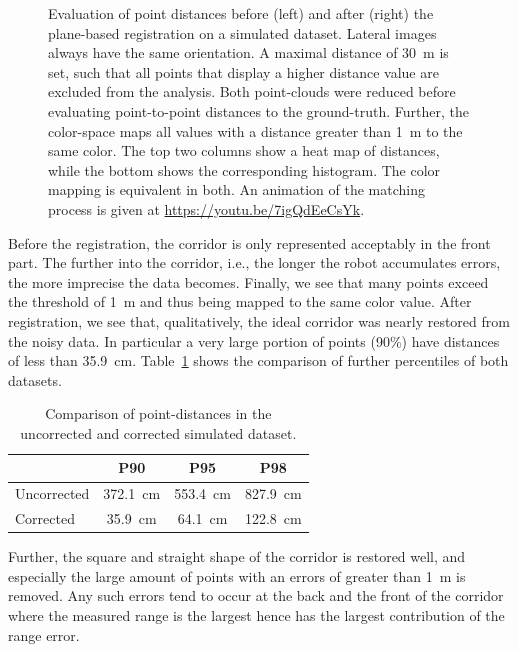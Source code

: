 \begin{figure}
\begin{minipage}[c]{0.495\textwidth}
  	\end{minipage} 	
 	\caption{Evaluation of point distances before (left) and after (right) the plane-based registration on a simulated dataset. Lateral images always have the same orientation. A maximal distance of \SI{30}{m} is set, such that all points that display a higher distance value are excluded from the analysis. Both point-clouds were reduced before evaluating point-to-point distances to the ground-truth. Further, the color-space maps all values with a distance greater than \SI{1}{m} to the same color. The top two columns show a heat map of distances, while the bottom shows the corresponding histogram. The color mapping is equivalent in both. An animation of the matching process is given at \url{https://youtu.be/7igQdEeCsYk}.} 
 	\label{fig:simulatedEvaluation}
\end{figure} 

Before the registration, the corridor is only represented acceptably in the front part. 
The further into the corridor, i.e., the longer the robot accumulates errors, the more imprecise the data becomes. 
Finally, we see that many points exceed the threshold of \SI{1}{\meter} and thus being mapped to the same color value.
After registration, we see that, qualitatively, the ideal corridor was nearly restored from the noisy data. 
In particular a very large portion of points (90\%) have distances of less than \SI{35.9}{\centi\meter}.
Table~\ref{tab:percentiles} shows the comparison of further percentiles of both datasets. 

\begin{table}
	\centering
	\begin{tabular}{@{}lccc@{}}\hline
		& P90 & P95 & P98 \\ \hline\hline
		Uncorrected & \SI{372.1}{\centi\meter} &  \SI{553.4}{\centi\meter} &  \SI{827.9}{\centi\meter} \\%
		Corrected & \SI{35.9}{\centi\meter} &  \SI{64.1}{\centi\meter} &  \SI{122.8}{\centi\meter} \\\hline%
	\end{tabular}
	\caption{Comparison of point-distances in the uncorrected and corrected simulated dataset.}
	\label{tab:percentiles}
\end{table}

Further, the square and straight shape of the corridor is restored well, and especially the large amount of points with an errors of greater than \SI{1}{m} is removed. 
Any such errors tend to occur at the back and the front of the corridor where the measured range is the largest hence has the largest contribution of the range error. 

